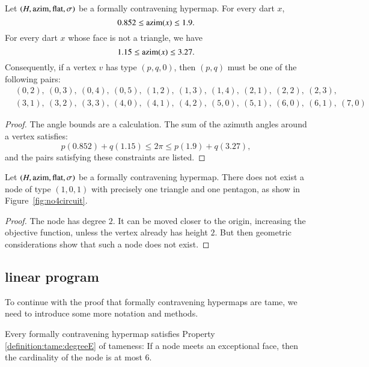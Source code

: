 \begin{lemma}
\begin{lemma}
\begin{lemma} \label{lemma:0.852}
Let $(H,{\operatorname{azim}},\operatorname{flat},\sigma)$ be a formally contravening
hypermap. For every dart $x$,
    $$0.852\le {\operatorname{azim}}(x)\le 1.9.$$
For every dart $x$ whose face is not a triangle, we have
    $$1.15\le{\operatorname{azim}}(x)\le 3.27.$$
Consequently, if a vertex $v$ has type $(p,q,0)$, then $(p,q)$
must be one of the following pairs:
$$
\begin{array}{lll}
&(0,2),~(0,3),~(0,4),~(0,5),~(1,2),~(1,3),~(1,4),~(2,1),~(2,2),~(2,3),\\
&(3,1),~(3,2),~(3,3),~(4,0),~(4,1),~(4,2),~(5,0),~(5,1),~(6,0),~(6,1),~(7,0)
\end{array}
$$
\end{lemma}
\begin{proof}
The angle bounds are a calculation.  The sum of the azimuth angles
around a vertex satisfies:
$$
  p (0.852) + q (1.15) \le 2\pi \le p (1.9) + q (3.27),
$$
and the pairs satisfying these constraints are listed.
\end{proof}



\begin{lemma}\label{lemma:nobad4}
Let $(H,{\operatorname{azim}},\operatorname{flat},\sigma)$ be a formally contravening hypermap.
There does not exist a node of 
type $(1,0,1)$ with precisely one triangle and
one pentagon, as show in Figure~\ref{fig:no4circuit}. 
\end{lemma}

\begin{proof}  The node has degree $2$.  It can be moved closer
to the origin, increasing the objective function, unless the
vertex already has height $2$.  But then geometric considerations
show that such a node does not exist.
\end{proof}




\subsection{linear program} %
\label{sec:2.2}  To continue with the proof that formally
contravening hypermaps are tame, we need to introduce some more
notation and methods.

\begin{lemma} \label{lemma:deg5}
Every formally contravening hypermap satisfies Property
\ref{definition:tame:degreeE} of tameness: If a node meets an
exceptional face, then the cardinality of the node is at most $6$.
\end{lemma}



\end{lemma}
\end{lemma}
